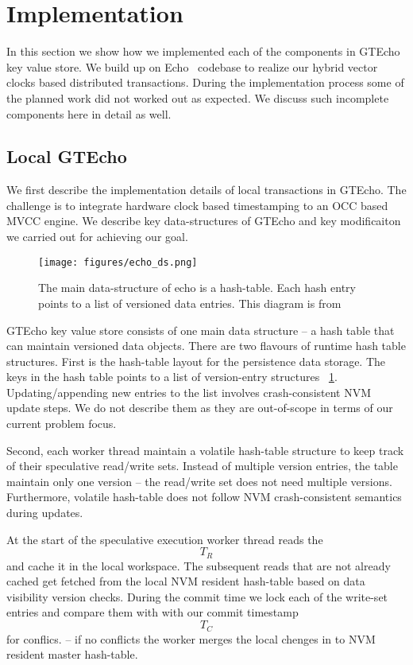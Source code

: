 
\section{Implementation}
In this section we show how we implemented each of the components in GTEcho key value store.
We build up on Echo~\cite{echo} codebase to realize our hybrid vector clocks based distributed transactions.
During the implementation process some of the planned work did not worked out as expected. 
We discuss such incomplete components here in detail as well.


\subsection{Local GTEcho}

We first describe the implementation details of local transactions in GTEcho. 
The challenge is to integrate hardware clock based timestamping to an OCC based
MVCC engine. We describe key data-structures of GTEcho and key modificaiton we 
carried out for achieving our goal.

\begin{figure}[]   
	\centering
	\texttt{[image: figures/echo\_ds.png]} 
	\caption{The main data-structure of echo is a hash-table. Each hash entry points to a list of versioned data entries. This diagram is from ~\cite{echo}} 
	\label{fig:echods} 
\end{figure}

GTEcho key value store consists of one main data structure -- a hash table that can maintain versioned data objects. 
There are two flavours of runtime hash table structures. First is the hash-table layout for the 
persistence data storage. The keys in the hash table points to a list of version-entry structures ~\ref{fig:echods}.
Updating/appending new entries to the list involves crash-consistent NVM update steps. We do not describe them as they
are out-of-scope in terms of our current problem focus.

Second, each worker thread maintain a volatile hash-table structure to keep track of their speculative read/write sets.
Instead of multiple version entries, the table maintain only one version -- the read/write set does not need multiple versions.
Furthermore, volatile hash-table does not follow NVM crash-consistent semantics during updates.

At the start of the speculative execution worker thread reads the \[ T_R \] and cache it in the local workspace. The subsequent
reads that are not already cached get fetched from the local NVM resident hash-table based on data visibility version checks.
During the commit time we lock each of the write-set entries and compare them with with our commit timestamp \[T_C\] for 
conflics. -- if no conflicts the worker merges the local chenges in to NVM resident master hash-table.

